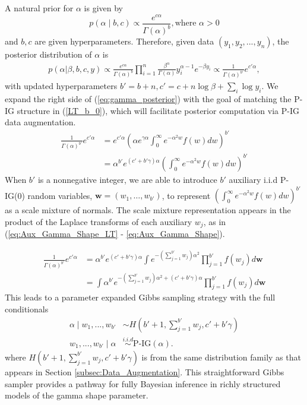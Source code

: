 \documentclass{statsoc}
\newcommand{\w}{\bm{w}}
\begin{document}
A natural prior for $\alpha$ is given by
$$
p\left(\alpha \mid b, c\right) \propto \frac{e^{c\alpha} }{\Gamma\left(\alpha\right)^b}, \text{where } \alpha > 0
$$
and $b, c$ are given hyperparameters.
Therefore, given data $\left(y_1, y_2, ..., y_n\right)$, the posterior distribution of $\alpha$ is 
\begin{align}
p\left(\alpha |\beta, b, c, y\right) \propto \frac{e^{c\alpha} }{\Gamma\left(\alpha\right)^b} \prod_{i=1}^n  \frac{\beta^\alpha}{\Gamma\left(\alpha\right)} y_i^{\alpha - 1} e^{-\beta y_i} \propto \frac{1}{\Gamma\left(\alpha\right)^{b'}}e^{c'\alpha},\label{eq:gamma_posterior}
\end{align}
with updated hyperparameters $b' = b+n,  c' = c+n\log\beta+\sum_i \log y_i$. We expand the right side of (\ref{eq:gamma_posterior}) with the goal of matching the P-IG structure in (\ref{LT_b_0}), which will facilitate posterior computation via P-IG data augmentation.   
\begin{align*}
\frac{1}{\Gamma\left(\alpha\right)^{b'}}e^{c'\alpha} &= e^{c'\alpha} \left( \alpha e^{\gamma \alpha} \int_0^\infty e^{-\alpha^2w} f(w)dw\right)^{b'}\\
&= \alpha^{b'}e^{(c' + b'\gamma)\alpha} \left(\int_0^\infty e^{-\alpha^2w} f(w)dw\right)^{b'}
\end{align*}
When $b'$ is a nonnegative integer, we are able to introduce $b'$ auxiliary i.i.d P-IG(0) random variables, $\w = \left(w_1, \ldots, w_{b'}\right)$, to represent $\left(\int_0^\infty e^{-\alpha^2w} f(w)dw\right)^{b'}$ as a scale mixture of normals.  The scale mixture representation appears in the product of the Laplace transforms of each auxiliary $w_j$, as in (\ref{eq:Aux_Gamma_Shape_LT} - \ref{eq:Aux_Gamma_Shape}).  

\begin{align}
\frac{1}{\Gamma\left(\alpha\right)^{b'}}e^{c'\alpha} &= \alpha^{b'}e^{(c' + b'\gamma)\alpha} \int  e^{-(\sum_{j=1}^{b'} w_j) \alpha^2} \prod_{j=1}^{b'}f(w_j)d\w \label{eq:Aux_Gamma_Shape_LT} \\ 
&=  \int  \alpha^{b'}e^{-(\sum_{j=1}^{b'} w_j) \alpha^2 + (c' + b'\gamma)\alpha} \prod_{j=1}^{b'}f(w_j)d\w \label{eq:Aux_Gamma_Shape}
\end{align}
This leads to a parameter expanded Gibbs sampling strategy with the full conditionals 
\begin{align*}
\alpha \mid w_1, ..., w_{b'} &\sim  H(b'+1, \sum_{j=1}^{b'} w_j, c' + b'\gamma)\\
w_1, ..., w_{b'} \mid \alpha &\overset{i.i.d}{\sim} \mbox{P-IG}\left(\alpha\right).
\end{align*}
where $H(b'+1, \sum_{j=1}^{b'} w_j, c' + b'\gamma)$ is from the same distribution family as that appears in Section \ref{subsec:Data_Augmentation}. 
This straightforward Gibbs sampler provides a pathway for fully Bayesian inference in richly structured models of the gamma shape parameter.  
\end{document}
